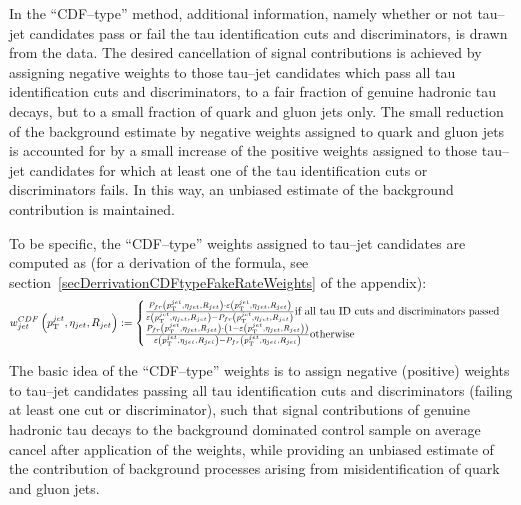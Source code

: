 In the ``CDF--type'' method, additional information, namely whether or not
tau--jet candidates pass or fail the tau identification cuts and discriminators,
is drawn from the data.  The desired cancellation of signal contributions is
achieved by assigning negative weights to those tau--jet candidates which pass
all tau identification cuts and discriminators, \ie to a fair fraction of
genuine hadronic tau decays, but to a small fraction of quark and gluon jets
only.  The small reduction of the background estimate by negative weights
assigned to quark and gluon jets is accounted for by a small increase of the
positive weights assigned to those tau--jet candidates for which at least one of
the tau identification cuts or discriminators fails.  In this way, an unbiased
estimate of the background contribution is maintained.

To be specific, the ``CDF--type'' weights assigned to tau--jet candidates are computed as
(for a derivation of the formula, see section~\ref{secDerrivationCDFtypeFakeRateWeights} of the appendix):
\begin{equation}
w_{jet}^{CDF} \left( p_{\mathrm{T}}^{jet}, \eta_{jet}, R_{jet} \right) 
:= 
\begin{cases} 
   \frac{P_{fr} \left( p_{\mathrm{T}}^{jet}, \eta_{jet}, R_{jet} \right) \cdot 
         \varepsilon \left( p_{\mathrm{T}}^{jet}, \eta_{jet}, R_{jet} \right)}
        {\varepsilon \left( p_{\mathrm{T}}^{jet}, \eta_{jet}, R_{jet} \right) - P_{fr} \left( p_{\mathrm{T}}^{jet}, \eta_{jet}, R_{jet} \right)}
      \mbox{if all tau ID cuts and discriminators passed} \\
   \frac{P_{fr} \left( p_{\mathrm{T}}^{jet}, \eta_{jet}, R_{jet} \right) \cdot 
         \left( 1 - \varepsilon \left( p_{\mathrm{T}}^{jet}, \eta_{jet}, R_{jet} \right) \right)}
        {\varepsilon \left( p_{\mathrm{T}}^{jet}, \eta_{jet}, R_{jet} \right) - P_{fr} \left( p_{\mathrm{T}}^{jet}, \eta_{jet}, R_{jet} \right)}
      \mbox{otherwise}
\end{cases}
\label{eqBgEstFakeRate_frCDFtypeJetWeight}
\end{equation}

The basic idea of the ``CDF--type'' weights is to assign negative (positive)
weights to tau--jet candidates passing all tau identification cuts and
discriminators (failing at least one cut or discriminator), such that signal
contributions of genuine hadronic tau decays to the background dominated control
sample on average cancel after application of the weights, while providing an
unbiased estimate of the contribution of background processes arising from
misidentification of quark and gluon jets.


